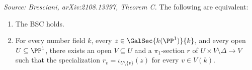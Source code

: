 \begin{theorem}[TheoremC]
  \label{thm:main-C}
  \textit{Source: Bresciani, arXiv:2108.13397, Theorem C.}
  The following are equivalent:
  \begin{enumerate}
    \item The BSC holds.
    \item For every number field \(k\), every \(z \in \GalSec{k(\PP^1)}{k}\), and
      every open \(U \subseteq \PP^1\), there exists an open \(V \subseteq U\) and a
      \(\pi_1\)-section \(r\) of \(U \times V \setminus \Delta \to V\) such that the
      specialization \(r_v = \iota_{U \setminus \{v\}}(z)\) for every \(v \in V(k)\).
  \end{enumerate}
\end{theorem}

